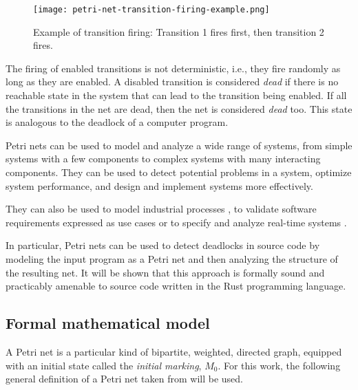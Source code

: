 \documentclass[../Thesis.tex]{subfiles}
\begin{document}
\begin{figure}[H]
    \centering
    \texttt{[image: petri-net-transition-firing-example.png]}
    \caption{Example of transition firing: Transition 1 fires first, then transition 2 fires.}
    \label{fig:petri-net-transition-firing-example}
\end{figure}

The firing of enabled transitions is not deterministic,
i.e., they fire randomly as long as they are enabled.
A disabled transition is considered \emph{dead}
if there is no reachable state in the system that can lead to the transition being enabled.
If all the transitions in the net are dead, then the net is considered \emph{dead} too.
This state is analogous to the deadlock of a computer program.

Petri nets can be used to model and analyze a wide range of systems,
from simple systems with a few components to complex systems with many interacting components.
They can be used to detect potential problems in a system,
optimize system performance, and design and implement systems more effectively.

They can also be used to model industrial processes \cite{aalst1994putting},
to validate software requirements expressed as use cases \cite{silva2004applying}
or to specify and analyze real-time systems \cite{kavi1996specification}.

In particular, Petri nets can be used to detect deadlocks in source code
by modeling the input program as a Petri net and then analyzing the structure of the resulting net.
It will be shown that this approach is formally sound and
practicably amenable to source code written in the Rust programming language.

\subsection{Formal mathematical model}

A Petri net is a particular kind of bipartite, weighted, directed graph,
equipped with an initial state called the \emph{initial marking}, $M_{0}$.
For this work, the following general definition of a Petri net
taken from \cite{murata1989} will be used.
\end{document}

